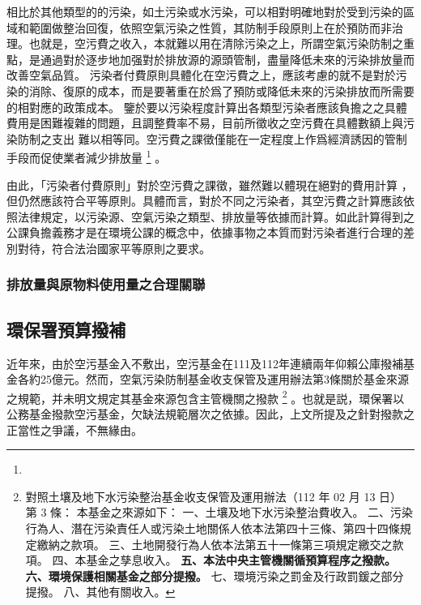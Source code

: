 \documentclass[12pt,a4paper]{article}
\begin{document}
相比於其他類型的的污染，如土污染或水污染，可以相對明確地對於受到污染的區域和範圍做整治回復，依照空氣污染之性質，其防制手段原則上在於預防而非治理。也就是，空污費之收入，本就難以用在清除污染之上，所謂空氣污染防制之重點，是通過對於逐步地加强對於排放源的源頭管制，盡量降低未來的污染排放量而改善空氣品質。
污染者付費原則具體化在空污費之上，應該考慮的就不是對於污染的消除、復原的成本，而是要著重在於爲了預防或降低未來的污染排放而所需要的相對應的政策成本。
鑒於要以污染程度計算出各類型污染者應該負擔之之具體費用是困難複雜的問題，且調整費率不易，目前所徵收之空污費在具體數額上與污染防制之支出
難以相等同。空污費之課徵僅能在一定程度上作爲經濟誘因的管制手段而促使業者減少排放量
\footnote{}
。

由此，「污染者付費原則」對於空污費之課徵，雖然難以體現在絕對的費用計算
，但仍然應該符合平等原則。具體而言，對於不同之污染者，其空污費之計算應該依照法律規定，以污染源、空氣污染之類型、排放量等依據而計算。如此計算得到之公課負擔義務才是在環境公課的概念中，依據事物之本質而對污染者進行合理的差別對待，符合法治國家平等原則之要求。


\subsubsection{排放量與原物料使用量之合理關聯}

\subsection{環保署預算撥補}

近年來，由於空污基金入不敷出，空污基金在111及112年連續兩年仰賴公庫撥補基金各約25億元。然而，空氣污染防制基金收支保管及運用辦法第3條關於基金來源之規範，并未明文規定其基金來源包含主管機關之撥款
\footnote{
對照土壤及地下水污染整治基金收支保管及運用辦法（112 年 02 月 13 日）
第 3 條：
本基金之來源如下：
一、土壤及地下水污染整治費收入。
二、污染行為人、潛在污染責任人或污染土地關係人依本法第四十三條、第四十四條規定繳納之款項。
三、土地開發行為人依本法第五十一條第三項規定繳交之款項。
四、本基金之孳息收入。
\textbf{五、本法中央主管機關循預算程序之撥款。
六、環境保護相關基金之部分提撥。}
七、環境污染之罰金及行政罰鍰之部分提撥。
八、其他有關收入。}
。也就是説，環保署以公務基金撥款空污基金，欠缺法規範層次之依據。因此，上文所提及之針對撥款之正當性之爭議，不無緣由。
\end{document}
